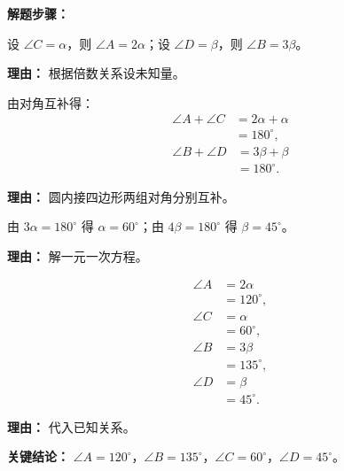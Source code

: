 \begin{examplebox}
	\textbf{\textcolor{CExample}{解题步骤：}}
	\begin{description}[style=nextline, leftmargin=2.8em, labelsep=0.5em, itemsep=0.45em]
		\item[\textbf{第一步（设角）：}] 设 $\angle C=\alpha$，则 $\angle A=2\alpha$；设 $\angle D=\beta$，则 $\angle B=3\beta$。
			\par\textbf{理由：} 根据倍数关系设未知量。
		\item[\textbf{第二步（列互补方程）：}] 由对角互补得：
			\[
				\begin{aligned}
					\angle A+\angle C &= 2\alpha+\alpha \\
					&= 180^\circ,
			\end{aligned}
			\]
			\[
				\begin{aligned}
					\angle B+\angle D &= 3\beta+\beta \\
					&= 180^\circ .
			\end{aligned}
			\]
			\par\textbf{理由：} 圆内接四边形两组对角分别互补。
		\item[\textbf{第三步（解方程）：}] 由 $3\alpha=180^\circ$ 得 $\alpha=60^\circ$；由 $4\beta=180^\circ$ 得 $\beta=45^\circ$。
			\par\textbf{理由：} 解一元一次方程。
		\item[\textbf{第四步（回代求角）：}]
			\[
				\begin{aligned}
					\angle A &= 2\alpha \\
					&= 120^\circ , \\
					\angle C &= \alpha \\
					&= 60^\circ , \\
					\angle B &= 3\beta \\
					&= 135^\circ , \\
					\angle D &= \beta \\
					&= 45^\circ .
			\end{aligned}
			\]
			\par\textbf{理由：} 代入已知关系。
	\end{description}

	\textbf{\textcolor{CExample}{关键结论：}}
	$\angle A=120^\circ$，$\angle B=135^\circ$，$\angle C=60^\circ$，$\angle D=45^\circ$。
\end{examplebox}
